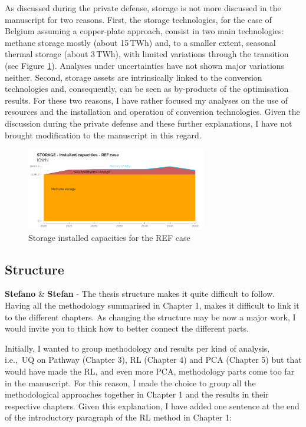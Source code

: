 \documentclass[12pt,a4paper]{article}
\def\ie{i.e.,\ }
\begin{document}
\noindent As discussed during the private defense, storage is not more discussed in the manuscript for two reasons. First, the storage technologies, for the case of Belgium assuming a copper-plate approach, consist in two main technologies: methane storage mostly (about 15\,TWh) and, to a smaller extent, seasonal thermal storage (about 3\,TWh), with limited variations through the transition (see Figure \ref{fig:STORAGE_2}). Analyses under uncertainties have not shown major variations neither. Second, storage assets are intrinsically linked to the conversion technologies and, consequently, can be seen as by-products of the optimisation results. For these two reasons, I have rather focused my analyses on the use of resources and the installation and operation of conversion technologies. Given the discussion during the private defense and these further explanations, I have not brought modification to the manuscript in this regard.

\begin{figure}[htbp!]
\centering
\includegraphics[width=0.7\textwidth]{STORAGE_2.pdf}
\caption{Storage installed capacities for the REF case}
\label{fig:STORAGE_2}
\end{figure}

\subsection{Structure}
\label{structure}

\begin{mdframed}[style=comment] %
{\color{orange} \textbf{Stefano}} \& {\color{teal} \textbf{Stefan}} - The thesis structure makes it quite difficult to follow. Having all the methodology summarised in Chapter 1, makes it difficult to link it to the different chapters. As changing the structure may be now a major work, I would invite you to think how to better connect the different parts. 
\end{mdframed}

\noindent Initially, I wanted to group methodology and results per kind of analysis, \ie UQ on Pathway (Chapter 3), RL (Chapter 4) and PCA (Chapter 5) but that would have made the RL, and even more PCA, methodology parts come too far in the manuscript. For this reason, I made the choice to group all the methodological approaches together in Chapter 1 and the results in their respective chapters.  Given this explanation, I have added one sentence {\color{blue}at the end of the introductory paragraph of the RL method in Chapter 1}:
\end{document}
